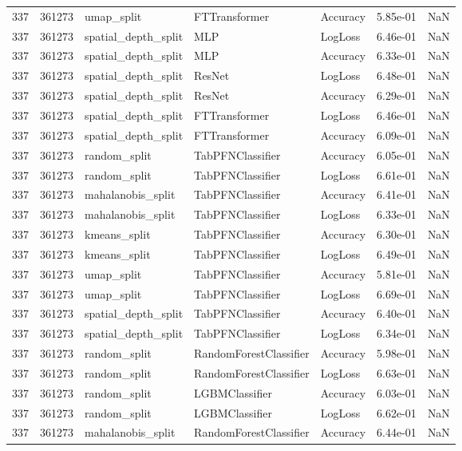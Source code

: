 \begin{tabular}{rrlllrr}
337 & 361273 & umap\_split & FTTransformer & Accuracy & 5.85e-01 & NaN \\
337 & 361273 & spatial\_depth\_split & MLP & LogLoss & 6.46e-01 & NaN \\
337 & 361273 & spatial\_depth\_split & MLP & Accuracy & 6.33e-01 & NaN \\
337 & 361273 & spatial\_depth\_split & ResNet & LogLoss & 6.48e-01 & NaN \\
337 & 361273 & spatial\_depth\_split & ResNet & Accuracy & 6.29e-01 & NaN \\
337 & 361273 & spatial\_depth\_split & FTTransformer & LogLoss & 6.46e-01 & NaN \\
337 & 361273 & spatial\_depth\_split & FTTransformer & Accuracy & 6.09e-01 & NaN \\
337 & 361273 & random\_split & TabPFNClassifier & Accuracy & 6.05e-01 & NaN \\
337 & 361273 & random\_split & TabPFNClassifier & LogLoss & 6.61e-01 & NaN \\
337 & 361273 & mahalanobis\_split & TabPFNClassifier & Accuracy & 6.41e-01 & NaN \\
337 & 361273 & mahalanobis\_split & TabPFNClassifier & LogLoss & 6.33e-01 & NaN \\
337 & 361273 & kmeans\_split & TabPFNClassifier & Accuracy & 6.30e-01 & NaN \\
337 & 361273 & kmeans\_split & TabPFNClassifier & LogLoss & 6.49e-01 & NaN \\
337 & 361273 & umap\_split & TabPFNClassifier & Accuracy & 5.81e-01 & NaN \\
337 & 361273 & umap\_split & TabPFNClassifier & LogLoss & 6.69e-01 & NaN \\
337 & 361273 & spatial\_depth\_split & TabPFNClassifier & Accuracy & 6.40e-01 & NaN \\
337 & 361273 & spatial\_depth\_split & TabPFNClassifier & LogLoss & 6.34e-01 & NaN \\
337 & 361273 & random\_split & RandomForestClassifier & Accuracy & 5.98e-01 & NaN \\
337 & 361273 & random\_split & RandomForestClassifier & LogLoss & 6.63e-01 & NaN \\
337 & 361273 & random\_split & LGBMClassifier & Accuracy & 6.03e-01 & NaN \\
337 & 361273 & random\_split & LGBMClassifier & LogLoss & 6.62e-01 & NaN \\
337 & 361273 & mahalanobis\_split & RandomForestClassifier & Accuracy & 6.44e-01 & NaN \\

\end{tabular}
